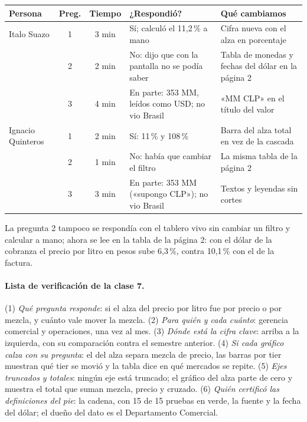 \begin{center}\footnotesize
\renewcommand{\arraystretch}{1.05}
\begin{tabular}{@{}l c c >{\raggedright\arraybackslash}p{4.4cm} >{\raggedright\arraybackslash}p{5.2cm}@{}}
\toprule
\textbf{Persona} & \textbf{Preg.} & \textbf{Tiempo} & \textbf{¿Respondió?} & \textbf{Qué cambiamos} \\
\midrule
Italo Suazo & 1 & 3 min & Sí; calculó el 11,2\,\% a mano & Cifra nueva con el alza en porcentaje \\
 & 2 & 2 min & No: dijo que con la pantalla no se podía saber & Tabla de monedas y fechas del dólar en la página 2 \\
 & 3 & 4 min & En parte: 353 MM, leídos como USD; no vio Brasil & «MM CLP» en el título del valor \\
\midrule
Ignacio Quinteros & 1 & 2 min & Sí: 11\,\% y 108\,\% & Barra del alza total en vez de la cascada \\
 & 2 & 1 min & No: había que cambiar el filtro & La misma tabla de la página 2 \\
 & 3 & 3 min & En parte: 353 MM («supongo CLP»); no vio Brasil & Textos y leyendas sin cortes \\
\bottomrule
\end{tabular}
\end{center}

\noindent La pregunta 2 tampoco se respondía con el tablero vivo sin cambiar un filtro y calcular a mano; ahora se lee en la tabla de la página 2: con el dólar de la cobranza el precio por litro en pesos sube 6,3\,\%, contra 10,1\,\% con el de la factura.

\paragraph{Lista de verificación de la clase 7.} (1) \emph{Qué pregunta responde}: si el alza del precio por litro fue por precio o por mezcla, y cuánto vale mover la mezcla. (2) \emph{Para quién y cada cuánto}: gerencia comercial y operaciones, una vez al mes. (3) \emph{Dónde está la cifra clave}: arriba a la izquierda, con su comparación contra el semestre anterior. (4) \emph{Si cada gráfico calza con su pregunta}: el del alza separa mezcla de precio, las barras por tier muestran qué tier se movió y la tabla dice en qué mercados se repite. (5) \emph{Ejes truncados y totales}: ningún eje está truncado; el gráfico del alza parte de cero y muestra el total que suman mezcla, precio y cruzado. (6) \emph{Quién certificó las definiciones del pie}: la cadena, con 15 de 15 pruebas en verde, la fuente y la fecha del dólar; el dueño del dato es el Departamento Comercial.
